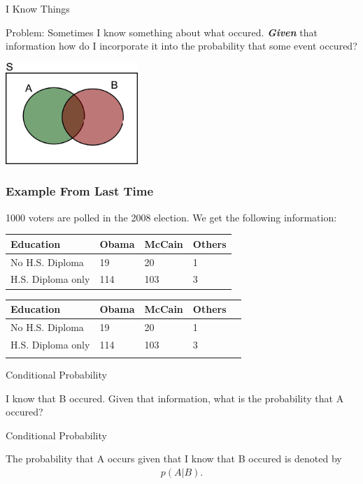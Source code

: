 \begin{frame}{I Know Things}

  Problem: Sometimes I know something about what
  occured. \textit{\textbf{Given}} that information how do I incorporate it
  into the probability that some event occured?

  \vfill
  \includegraphics[width=5cm]{img/vennDiagram}
  \vfill
  
\end{frame}

\begin{frame}
  \frametitle{Example From Last Time}

  1000 voters are polled in the 2008 election. We get the following
  information: \\
  {
    \begin{tabular}{l|l|l|l}
      Education & Obama & McCain & Others  \\ \hline
      No H.S. Diploma & 19 & 20 & 1   \\
      H.S. Diploma only & 114 & 103 & 3 
    \end{tabular}
  }
  {
    \begin{tabular}{l|l|l|l|l}
      Education & Obama & McCain & Others & \color{red}{Total} \\ \hline
      No H.S. Diploma & 19 & 20 & 1 & \color{red}{40} \\
      H.S. Diploma only & 114 & 103 & 3 & \color{red}{220} \\ \hline
      \color{red}{Total} & \color{red}{133} & \color{red}{123} & \color{red}{4} & \color{blue}{260}
    \end{tabular}
  }



\end{frame}



\begin{frame}{Conditional Probability}

  I know that B occured. Given that information, what is the
  probability that A occured?

  \begin{definition}{Conditional Probability}

    The probability that A occurs given that I know that B occured is
    denoted by
    \begin{eqnarray*}
      p(A|B).
    \end{eqnarray*}
    
  \end{definition}
  
\end{frame}




